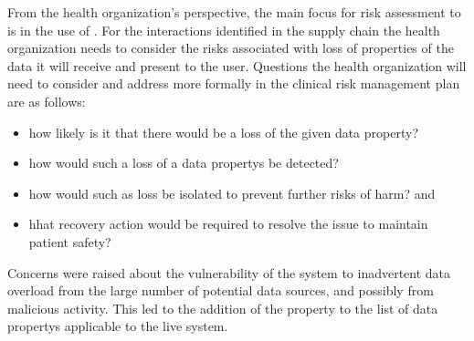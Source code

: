 \begin{minipage}[t]{0.73\textwidth}
  From the health organization's perspective, the main focus for risk assessment to  is in the use of . For the interactions identified in the supply chain the health organization needs to consider the risks associated with loss of properties of the data it will receive and present to the user. Questions the health organization will need to consider and address more formally in the clinical risk management plan are as follows:
\end{minipage}
\begin{minipage}[t]{0.25\textwidth}
  \centering{}
\end{minipage}

\begin{itemize}
  \item how likely is it that there would be a loss of the given \gls{data property}?
  \item how would such a loss of a \glspl{data property} be detected?
  \item how would such as loss be isolated to prevent further risks of harm? and
  \item hhat recovery action would be required to resolve the issue to maintain patient safety?
\end{itemize}

Concerns were raised about the vulnerability of the system to inadvertent data overload from the large number of potential data sources, and possibly from malicious activity. This led to the addition of the  property to the list of \glspl{data property} applicable to the live system.

